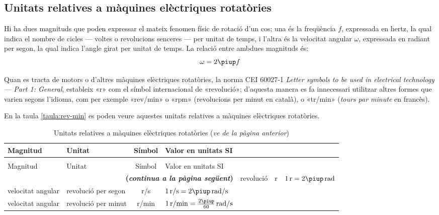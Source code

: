 \subsection{Unitats relatives a màquines elèctriques rotatòries}\label{sec:unit-maq-rotativ}

Hi ha dues magnituds que poden expressar el mateix fenomen físic de rotació d'un cos; una és la freqüència $f$, expressada en hertz, la qual indica el nombre de cicles --- voltes o revolucions senceres --- per unitat de temps, i l'altra és la velocitat angular $\omega$, expressada en radiant per segon, la qual indica l'angle girat per unitat de temps. La relació entre ambdues magnituds és:
\begin{equation}
  \omega = 2 \piup f
\end{equation}

Quan es tracta de motors o d'altres màquines elèctriques rotatòries, la norma CEI 60027-1 \textit{Letter symbols to be used in electrical technology --- Part 1: General}, estableix «r» com el símbol internacional de «revolució»;  d'aquesta manera es fa innecessari utilitzar altres formes que varien segons l'idioma, com per exemple «rev/min» o «rpm» (revolucions per minut en català), o «tr/min» (\textit{tours par minute} en francès). 

En la taula \vref{taula:rev-min} es poden veure aquestes unitats relatives a màquines elèctriques rotatòries.

\begin{longtable}[h]{llcl}
   \caption{\label{taula:rev-min} Unitats relatives a màquines elèctriques rotatòries}\\
   \toprule[1pt]
    Magnitud & Unitat &  Símbol & Valor en unitats SI \\
   \midrule
   \endfirsthead
   \caption[]{Unitats relatives a màquines elèctriques rotatòries (\emph{ve de la pàgina anterior})}\\
   \toprule[1pt]
    Magnitud & Unitat &  Símbol & Valor en unitats SI \\
   \midrule
   \endhead
   \midrule
   \multicolumn{4}{r}{\sffamily\bfseries\color{NavyBlue}(\emph{continua a la pàgina següent})}
   \endfoot
   \endlastfoot
   angle pla & revolució &  \unit{r} & $\qty{1}{r} = 2\piup\unit{\,rad}$  \\
   velocitat angular & revolució per segon &  \unit{r/s}& $\qty{1}{r/s} = 2\piup\unit{\,rad/s}$  \\
   velocitat angular & revolució per minut &  \unit{r/min}& $\qty{1}{r/min} = \frac{2\piup}{60}\unit{\,rad/s}$  \\
   \bottomrule[1pt]
\end{longtable}


